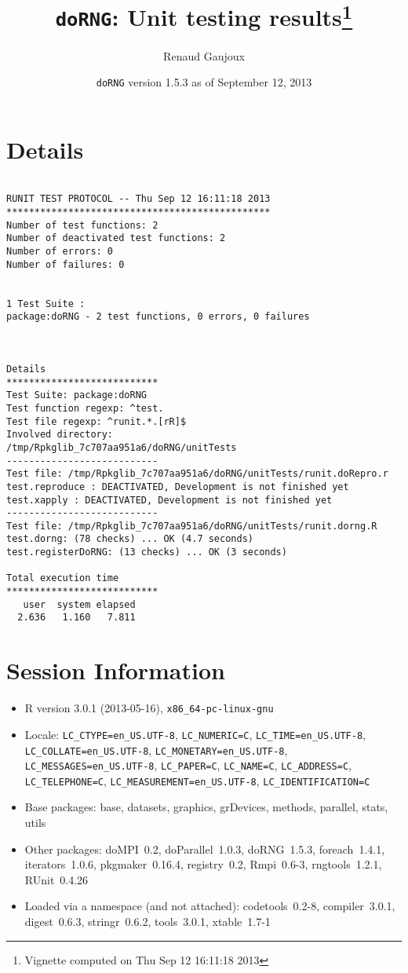 \documentclass[10pt]{article}\usepackage[]{graphicx}\usepackage[]{color}
\author{Renaud Gaujoux}
\title{\texttt{doRNG}: Unit testing results\footnote{Vignette computed  on Thu Sep 12 16:11:18 2013}}
\date{\texttt{doRNG} version 1.5.3 as of September 12, 2013}
\begin{document}
\maketitle

\section{Details}
\begin{verbatim}

RUNIT TEST PROTOCOL -- Thu Sep 12 16:11:18 2013 
*********************************************** 
Number of test functions: 2 
Number of deactivated test functions: 2 
Number of errors: 0 
Number of failures: 0 

 
1 Test Suite : 
package:doRNG - 2 test functions, 0 errors, 0 failures



Details 
*************************** 
Test Suite: package:doRNG 
Test function regexp: ^test. 
Test file regexp: ^runit.*.[rR]$ 
Involved directory: 
/tmp/Rpkglib_7c707aa951a6/doRNG/unitTests 
--------------------------- 
Test file: /tmp/Rpkglib_7c707aa951a6/doRNG/unitTests/runit.doRepro.r 
test.reproduce : DEACTIVATED, Development is not finished yet
test.xapply : DEACTIVATED, Development is not finished yet
--------------------------- 
Test file: /tmp/Rpkglib_7c707aa951a6/doRNG/unitTests/runit.dorng.R 
test.dorng: (78 checks) ... OK (4.7 seconds)
test.registerDoRNG: (13 checks) ... OK (3 seconds)

Total execution time
***************************
   user  system elapsed 
  2.636   1.160   7.811 

\end{verbatim}

\section*{Session Information}
\begin{itemize}\raggedright
  \item R version 3.0.1 (2013-05-16), \verb|x86_64-pc-linux-gnu|
  \item Locale: \verb|LC_CTYPE=en_US.UTF-8|, \verb|LC_NUMERIC=C|, \verb|LC_TIME=en_US.UTF-8|, \verb|LC_COLLATE=en_US.UTF-8|, \verb|LC_MONETARY=en_US.UTF-8|, \verb|LC_MESSAGES=en_US.UTF-8|, \verb|LC_PAPER=C|, \verb|LC_NAME=C|, \verb|LC_ADDRESS=C|, \verb|LC_TELEPHONE=C|, \verb|LC_MEASUREMENT=en_US.UTF-8|, \verb|LC_IDENTIFICATION=C|
  \item Base packages: base, datasets, graphics, grDevices, methods,
    parallel, stats, utils
  \item Other packages: doMPI~0.2, doParallel~1.0.3, doRNG~1.5.3,
    foreach~1.4.1, iterators~1.0.6, pkgmaker~0.16.4, registry~0.2,
    Rmpi~0.6-3, rngtools~1.2.1, RUnit~0.4.26
  \item Loaded via a namespace (and not attached): codetools~0.2-8,
    compiler~3.0.1, digest~0.6.3, stringr~0.6.2, tools~3.0.1,
    xtable~1.7-1
\end{itemize}
\end{document}
